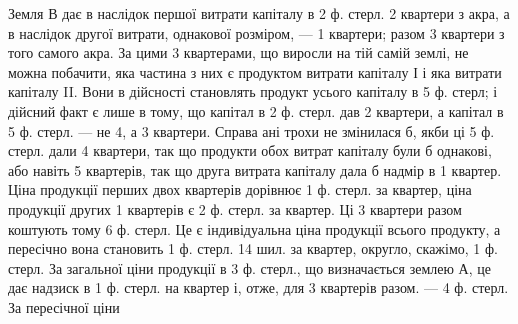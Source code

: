
Земля $В$ дає в наслідок першої витрати капіталу в 2 ф. стерл. 2 квартери
з акра, а в наслідок другої витрати, однакової розміром, — 1 квартери; разом
3 квартери з того самого акра. За цими 3 квартерами, що виросли
на тій самій землі, не можна побачити, яка частина з них є продуктом витрати
капіталу І і яка витрати капіталу II. Вони в дійсності становлять продукт
усього капіталу в 5 ф. стерл; і дійсний факт є лише в тому, що капітал
в 2 ф. стерл. дав 2 квартери, а капітал в 5 ф. стерл. — не 4, а 3 квартери.
Справа ані трохи не змінилася б, якби ці 5 ф. стерл. дали 4 квартери, так що
продукти обох витрат капіталу були б однакові, або навіть 5 квартерів, так
що друга витрата капіталу дала б надмір в 1 квартер. Ціна продукції перших
двох квартерів дорівнює 1 ф. стерл. за квартер, ціна продукції других 1 квартерів є 2 ф.
стерл. за квартер. Ці 3 квартери разом коштують тому 6 ф. стерл.
Це є індивідуальна ціна продукції всього продукту, а пересічно вона становить
1 ф. стерл. 14 шил. за квартер, округло, скажімо, 1 ф. стерл. За загальної ціни
продукції в 3 ф. стерл., що визначається землею $А$, це дає надзиск в 1 ф. стерл.
на квартер і, отже, для 3 квартерів разом. — 4 ф. стерл. За пересічної ціни
\parbreak{}  %
